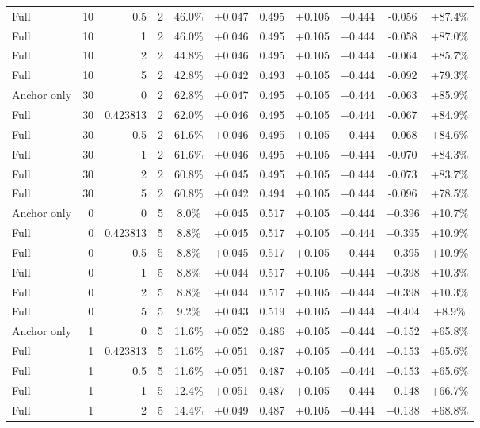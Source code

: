 \begin{table}[htbp]
\begin{tabular}{lrrrccccccc}
Full & 10 & 0.5 & 2 & 46.0\% & +0.047 & 0.495 & +0.105 & +0.444 & -0.056 & +87.4\% \\
Full & 10 & 1 & 2 & 46.0\% & +0.046 & 0.495 & +0.105 & +0.444 & -0.058 & +87.0\% \\
Full & 10 & 2 & 2 & 44.8\% & +0.046 & 0.495 & +0.105 & +0.444 & -0.064 & +85.7\% \\
Full & 10 & 5 & 2 & 42.8\% & +0.042 & 0.493 & +0.105 & +0.444 & -0.092 & +79.3\% \\
Anchor only & 30 & 0 & 2 & 62.8\% & +0.047 & 0.495 & +0.105 & +0.444 & -0.063 & +85.9\% \\
Full & 30 & 0.423813 & 2 & 62.0\% & +0.046 & 0.495 & +0.105 & +0.444 & -0.067 & +84.9\% \\
Full & 30 & 0.5 & 2 & 61.6\% & +0.046 & 0.495 & +0.105 & +0.444 & -0.068 & +84.6\% \\
Full & 30 & 1 & 2 & 61.6\% & +0.046 & 0.495 & +0.105 & +0.444 & -0.070 & +84.3\% \\
Full & 30 & 2 & 2 & 60.8\% & +0.045 & 0.495 & +0.105 & +0.444 & -0.073 & +83.7\% \\
Full & 30 & 5 & 2 & 60.8\% & +0.042 & 0.494 & +0.105 & +0.444 & -0.096 & +78.5\% \\
Anchor only & 0 & 0 & 5 & 8.0\% & +0.045 & 0.517 & +0.105 & +0.444 & +0.396 & +10.7\% \\
Full & 0 & 0.423813 & 5 & 8.8\% & +0.045 & 0.517 & +0.105 & +0.444 & +0.395 & +10.9\% \\
Full & 0 & 0.5 & 5 & 8.8\% & +0.045 & 0.517 & +0.105 & +0.444 & +0.395 & +10.9\% \\
Full & 0 & 1 & 5 & 8.8\% & +0.044 & 0.517 & +0.105 & +0.444 & +0.398 & +10.3\% \\
Full & 0 & 2 & 5 & 8.8\% & +0.044 & 0.517 & +0.105 & +0.444 & +0.398 & +10.3\% \\
Full & 0 & 5 & 5 & 9.2\% & +0.043 & 0.519 & +0.105 & +0.444 & +0.404 & +8.9\% \\
Anchor only & 1 & 0 & 5 & 11.6\% & +0.052 & 0.486 & +0.105 & +0.444 & +0.152 & +65.8\% \\
Full & 1 & 0.423813 & 5 & 11.6\% & +0.051 & 0.487 & +0.105 & +0.444 & +0.153 & +65.6\% \\
Full & 1 & 0.5 & 5 & 11.6\% & +0.051 & 0.487 & +0.105 & +0.444 & +0.153 & +65.6\% \\
Full & 1 & 1 & 5 & 12.4\% & +0.051 & 0.487 & +0.105 & +0.444 & +0.148 & +66.7\% \\
Full & 1 & 2 & 5 & 14.4\% & +0.049 & 0.487 & +0.105 & +0.444 & +0.138 & +68.8\% \\

\end{tabular}
\end{table}
